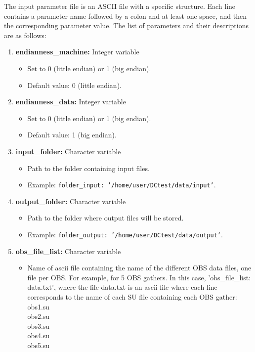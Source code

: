 \documentclass[11pt, oneside]{article}   	%
\begin{document}
The input parameter file is an ASCII file with a specific structure. Each line contains a parameter name followed by a colon and at least one space, and then the corresponding parameter value. The list of parameters and their descriptions are as follows:

\begin{enumerate}
\item \textbf{endianness\_machine:} Integer variable
\begin{itemize}
\item Set to 0 (little endian) or 1 (big endian).
\item Default value: 0 (little endian).
\end{itemize}

\item \textbf{endianness\_data:} Integer variable
\begin{itemize}
\item Set to 0 (little endian) or 1 (big endian).
\item Default value: 1 (big endian).
\end{itemize}

\item \textbf{input\_folder:} Character variable
\begin{itemize}
\item Path to the folder containing input files.
\item Example: \texttt{folder\_input: '/home/user/DCtest/data/input'}.
\end{itemize}

\item \textbf{output\_folder:} Character variable
\begin{itemize}
\item Path to the folder where output files will be stored.
\item Example: \texttt{folder\_output: '/home/user/DCtest/data/output'}.
\end{itemize}

\item \textbf{obs\_file\_list:} Character variable
\begin{itemize}
\item Name of ascii file containing the name of the different OBS data files, one file per OBS. For example, for 5 OBS gathers. In this case, 'obs\_file\_list: data.txt', where the file data.txt is an ascii file where each line corresponds to the name of each SU file containing each OBS gather:\\
obs1.su \\
obs2.su \\
obs3.su \\
obs4.su \\
obs5.su
\end{itemize}


\end{enumerate}
\end{document}
